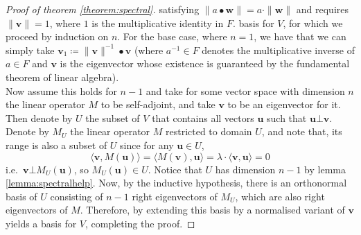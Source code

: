 \begin{proof}[Proof of theorem \ref{theorem:spectral}]
{		satisfying $\|a\bullet \mathbf{w}\| = a\cdot \|\mathbf{w}\|$
		and requires  $\|\mathbf{v}\|= 1$, where $1$ is the multiplicative identity in $F$.} 
		basis for $V$, for which we proceed by induction on $n$. For the base case, where 
		$n = 1$, we have that we can simply take $\mathbf{v}_1 \coloneqq 
		\|\mathbf{v}\|^{-1}\bullet \mathbf{v}$ (where $a^{-1} \in F$ denotes the 
		multiplicative inverse of $a\in F$ and $\mathbf{v}$ is the eigenvector whose 
		existence is guaranteed by the fundamental theorem of linear algebra). \\
		Now assume this holds for $n-1$ and take for some vector space with dimension $n$ 
		the linear operator $M$ to be self-adjoint, and take $\mathbf{v}$ to be an 
		eigenvector for it. Then denote by $U$ the subset of $V$ that contains all vectors 
		$\mathbf{u}$ such that $\mathbf{u}\bot\mathbf{v}$. Denote by $M_U$ the linear 
		operator $M$ restricted to domain $U$, and note that, its range is also a subset 
		of $U$ since for any $\mathbf{u}\in U$,
		$$
			\langle \mathbf{v},M(\mathbf{u})\rangle =
			\langle M(\mathbf{v}),\mathbf{u}\rangle = 
			\lambda \cdot \langle\mathbf{v} , \mathbf{u}\rangle =
			0
		$$
		i.e.\ $\mathbf{v}\bot M_U(\mathbf{u})$, so $M_U(\mathbf{u})\in U$. Notice that $U$ 
		has dimension $n-1$ by lemma \ref{lemma:spectralhelp}. 
		Now, by the inductive hypothesis, 
		there is an orthonormal basis of $U$ consisting of $n-1$ right eigenvectors of 
		$M_U$, which are also right eigenvectors of $M$. Therefore, by extending this 
		basis by a normalised variant of $\mathbf{v}$ yields a basis for $V$, completing 
		the proof.
	\end{proof}
